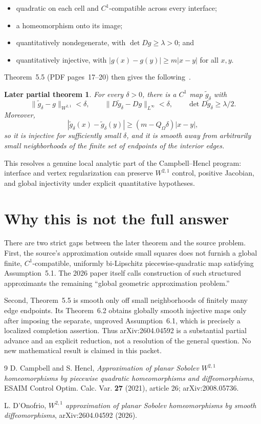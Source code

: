 \documentclass[11pt]{article}
\newtheorem*{laterresult}{Later partial theorem}
\begin{document}
\begin{itemize}
\item quadratic on each cell and $C^1$-compatible across every interface;
\item a homeomorphism onto its image;
\item quantitatively nondegenerate, with $\det Dg\geq\lambda>0$; and
\item quantitatively injective, with
      $|g(x)-g(y)|\geq m|x-y|$ for all $x,y$.
\end{itemize}

Theorem~5.5 (PDF pages~17--20) then gives the following~\cite{later}.

\begin{laterresult}
For every $\delta>0$, there is a $C^1$ map
$\widetilde g_\delta$ with
\[
 \|\widetilde g_\delta-g\|_{W^{2,1}}<\delta,
 \qquad
 \|D\widetilde g_\delta-Dg\|_{L^\infty}<\delta,
 \qquad
 \det D\widetilde g_\delta\geq\lambda/2.
\]
Moreover,
\[
 |\widetilde g_\delta(x)-\widetilde g_\delta(y)|
 \geq (m-Q_\Omega\delta)|x-y|,
\]
so it is injective for sufficiently small $\delta$, and it is smooth away
from arbitrarily small neighborhoods of the finite set of endpoints of the
interior edges.
\end{laterresult}

This resolves a genuine local analytic part of the Campbell--Hencl program:
interface and vertex regularization can preserve $W^{2,1}$ control,
positive Jacobian, and global injectivity under explicit quantitative
hypotheses.

\section{Why this is not the full answer}

There are two strict gaps between the later theorem and the source problem.
First, the source's approximation outside small squares does not furnish a
global finite, $C^1$-compatible, uniformly bi-Lipschitz piecewise-quadratic
map satisfying Assumption~5.1.  The 2026 paper itself calls construction of
such structured approximants the remaining ``global geometric
approximation problem.''

Second, Theorem~5.5 is smooth only off small neighborhoods of finitely many
edge endpoints.  Its Theorem~6.2 obtains globally smooth injective maps only
after imposing the separate, unproved Assumption~6.1, which is precisely a
localized completion assertion.  Thus arXiv:2604.04592 is a substantial
partial advance and an explicit reduction, not a resolution of the general
question.  No new mathematical result is claimed in this packet.

\begin{thebibliography}{9}
D. Campbell and S. Hencl,
\emph{Approximation of planar Sobolev $W^{2,1}$ homeomorphisms by
piecewise quadratic homeomorphisms and diffeomorphisms},
ESAIM Control Optim. Calc. Var. \textbf{27} (2021), article 26;
arXiv:2008.05736.

L. D'Onofrio,
\emph{$W^{2,1}$ approximation of planar Sobolev homeomorphisms by smooth
diffeomorphisms}, arXiv:2604.04592 (2026).
\end{thebibliography}
\end{document}
